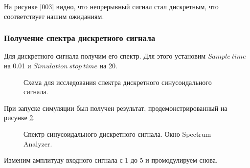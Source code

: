 \documentclass[a4paper,14pt]{extarticle}
\begin{document}
На рисунке \ref{003} видно, что непрерывный сигнал стал 
дискретным, что соответствует нашим ожиданиям.

\subsubsection{Получение спектра дискретного сигнала}

Для дискретного сигнала получим его спектр. Для этого установим 
$Sample \ time$ на 0.01 и $Simulation \ stop \ time$ на 20.

\begin{figure}[H]
\caption{Схема для исследования спектра дискретного 
синусоидального сигнала.}
\label{004}
\end{figure}

При запуске симуляции был получен результат, продемонстрированный 
на рисунке \ref{005}.

\begin{figure}[H]
\caption{Спектр синусоидального дискретного сигнала. Окно 
Spectrum Analyzer.}
\label{005}
\end{figure}

Изменим амплитуду входного сигнала с 1 до 5 и промодулируем 
снова.
\end{document}

